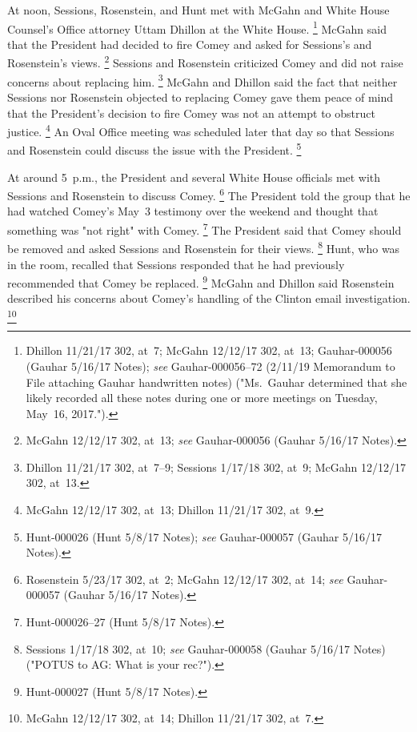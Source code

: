 At noon, Sessions, Rosenstein, and Hunt met with McGahn and White House Counsel's Office attorney Uttam Dhillon at the White House.%
\footnote{Dhillon 11/21/17 302, at~7;
McGahn 12/12/17 302, at~13;
Gauhar-000056 (Gauhar 5/16/17 Notes);
\textit{see} Gauhar-000056--72 (2/11/19 Memorandum to File attaching Gauhar handwritten notes) ("Ms.~Gauhar determined that she likely recorded all these notes during one or more meetings on Tuesday, May~16, 2017.").}
McGahn said that the President had decided to fire Comey and asked for Sessions's and Rosenstein's views.%
\footnote{McGahn 12/12/17 302, at~13;
\textit{see} Gauhar-000056 (Gauhar 5/16/17 Notes).}
Sessions and Rosenstein criticized Comey and did not raise concerns about replacing him.%
\footnote{Dhillon 11/21/17 302, at~7--9;
Sessions 1/17/18 302, at~9;
McGahn 12/12/17 302, at~13.}
McGahn and Dhillon said the fact that neither Sessions nor Rosenstein objected to replacing Comey gave them peace of mind that the President's decision to fire Comey was not an attempt to obstruct justice.%
\footnote{McGahn 12/12/17 302, at~13;
Dhillon 11/21/17 302, at~9.}
An Oval Office meeting was scheduled later that day so that Sessions and Rosenstein could discuss the issue with the President.%
\footnote{Hunt-000026 (Hunt 5/8/17 Notes);
\textit{see} Gauhar-000057 (Gauhar 5/16/17 Notes).}

At around 5~p.m., the President and several White House officials met with Sessions and Rosenstein to discuss Comey.%
\footnote{Rosenstein 5/23/17 302, at~2;
McGahn 12/12/17 302, at~14;
\textit{see} Gauhar-000057 (Gauhar 5/16/17 Notes).}
The President told the group that he had watched Comey's May~3 testimony over the weekend and thought that something was "not right" with Comey.%
\footnote{Hunt-000026--27 (Hunt 5/8/17 Notes).}
The President said that Comey should be removed and asked Sessions and Rosenstein for their views.%
\footnote{Sessions 1/17/18 302, at~10;
\textit{see} Gauhar-000058 (Gauhar 5/16/17 Notes) ("POTUS to AG: What is your rec?").}
Hunt, who was in the room, recalled that Sessions responded that he had previously recommended that Comey be replaced.%
\footnote{Hunt-000027 (Hunt 5/8/17 Notes).}
McGahn and Dhillon said Rosenstein described his concerns about Comey's handling of the Clinton email investigation.%
\footnote{McGahn 12/12/17 302, at~14;
Dhillon 11/21/17 302, at~7.}

